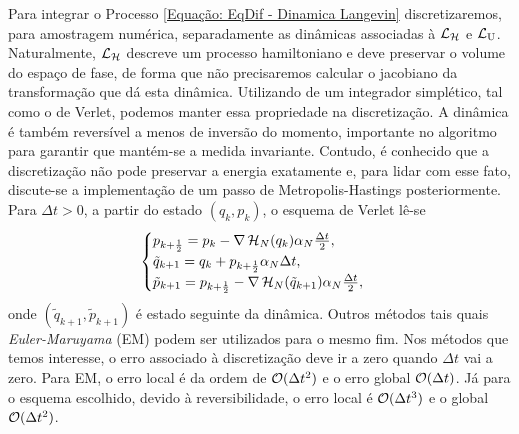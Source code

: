 \documentclass[12pt]{report}
\begin{document}
Para integrar o Processo \eqref{Equação: EqDif - Dinamica Langevin} discretizaremos, para amostragem numérica, separadamente as dinâmicas associadas à $\operatorname{\mathcal{L}}_{\operatorname{\mathcal{H}}}$ e $\operatorname{\mathcal{L}}_{\operatorname{U}}$. Naturalmente, $\operatorname{\mathcal{L}}_{\operatorname{\mathcal{H}}}$ descreve um processo hamiltoniano e deve preservar o volume do espaço de fase, de forma que não precisaremos calcular o jacobiano da transformação que dá esta dinâmica. Utilizando de um integrador simplético, tal como o de Verlet, podemos manter essa propriedade na discretização. A dinâmica é também reversível a menos de inversão do momento, importante no algoritmo para garantir que mantém-se a medida invariante. Contudo, é conhecido que a discretização não pode preservar a energia exatamente e, para lidar com esse fato, discute-se a implementação de um passo de Metropolis-Hastings posteriormente. Para $\Delta t > 0$, a partir do estado $(q_k, p_k)$, o esquema de Verlet lê-se
\begin{equation}
	\begin{cases}
		p_{k+\frac{1}{2}} = p_k - \nabla \operatorname{\mathcal{H}}_N(q_k) \alpha_N \frac{\Delta t}{2}, \\
		\tilde{q}_{k+1} = q_k + p_{k + \frac{1}{2}} \alpha_N \Delta t, \\
		\tilde{p}_{k+1} = p_{k+\frac{1}{2}} - \nabla \operatorname{\mathcal{H}}_N(\tilde{q}_{k+1}) \alpha_N \frac{\Delta t}{2},
	\end{cases}
	\label{Equation: Verlet}
\end{equation}
onde $(\tilde{q}_{k+1}, \tilde{p}_{k+1})$ é estado seguinte da dinâmica. Outros métodos tais quais \textit{Euler-Maruyama} (EM) podem ser utilizados para o mesmo fim.  \cite[Capítulo~7]{leimmolecular} Nos métodos que temos interesse, o erro associado à discretização deve ir a zero quando $\Delta t$ vai a zero. Para EM, o erro local é da ordem de $\mathcal{O}{(\Delta t^2)}$ e o erro global $\mathcal{O}{(\Delta t)}$. Já para o esquema escolhido, devido à reversibilidade, o erro local é $\mathcal{O}{(\Delta t^3)}$ e o global $\mathcal{O}{(\Delta t^2)}$. \cite[Capítulo~5]{handbookmontecarlo} 
\end{document}

